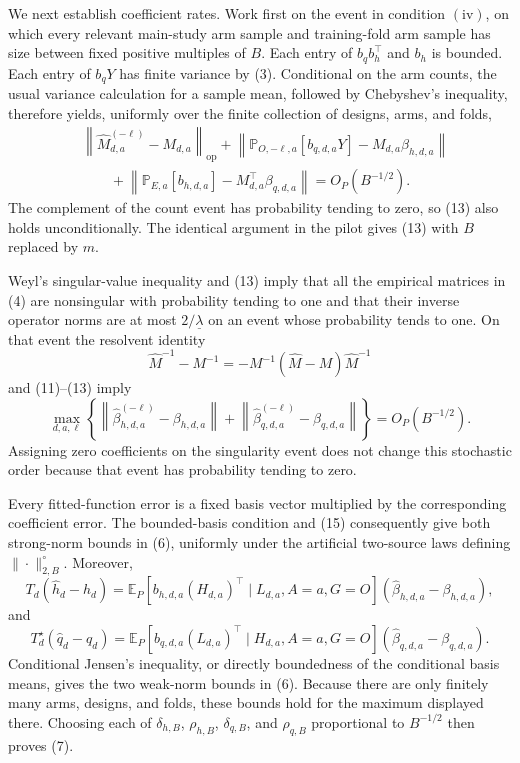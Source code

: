 We next establish coefficient rates.  Work first on the event in condition \(\mathrm{(iv)}\), on which every relevant main-study arm sample and training-fold arm sample has size between fixed positive multiples of \(B\).  Each entry of \(b_qb_h^\top\) and \(b_h\) is bounded.  Each entry of \(b_qY\) has finite variance by (3).  Conditional on the arm counts, the usual variance calculation for a sample mean, followed by Chebyshev's inequality, therefore yields, uniformly over the finite collection of designs, arms, and folds,
\[
\begin{aligned}
 &\left\|\widehat M_{d,a}^{(-\ell)}-M_{d,a}\right\|_{\mathrm{op}}
 +\left\|\mathbb P_{O,-\ell,a}[b_{q,d,a}Y]
             -M_{d,a}\beta_{h,d,a}\right\|\\
 &\qquad
 +\left\|\mathbb P_{E,a}[b_{h,d,a}]
             -M_{d,a}^\top\beta_{q,d,a}\right\|
 =O_P(B^{-1/2}).                                         \tag{13}
\end{aligned}
\]
The complement of the count event has probability tending to zero, so (13) also holds unconditionally.  The identical argument in the pilot gives (13) with \(B\) replaced by \(m\).

Weyl's singular-value inequality and (13) imply that all the empirical matrices in (4) are nonsingular with probability tending to one and that their inverse operator norms are at most \(2/\underline\lambda\) on an event whose probability tends to one.  On that event the resolvent identity
\[
 \widehat M^{-1}-M^{-1}
 =-M^{-1}(\widehat M-M)\widehat M^{-1}                   \tag{14}
\]
and (11)--(13) imply
\[
 \max_{d,a,\ell}\left\{
 \left\|\widehat\beta_{h,d,a}^{(-\ell)}-\beta_{h,d,a}\right\|
 +\left\|\widehat\beta_{q,d,a}^{(-\ell)}-\beta_{q,d,a}\right\|
 \right\}=O_P(B^{-1/2}).                                \tag{15}
\]
Assigning zero coefficients on the singularity event does not change this stochastic order because that event has probability tending to zero.

Every fitted-function error is a fixed basis vector multiplied by the corresponding coefficient error.  The bounded-basis condition and (15) consequently give both strong-norm bounds in (6), uniformly under the artificial two-source laws defining \(\|\cdot\|_{2,B}^{\circ}\).  Moreover,
\[
 T_d(\widehat h_d-h_d)
 =\mathbb E_P\!\left[b_{h,d,a}(H_{d,a})^\top
 \mid L_{d,a},A=a,G=O\right]
 (\widehat\beta_{h,d,a}-\beta_{h,d,a}),                  \tag{16}
\]
and
\[
 T_d^\star(\widehat q_d-q_d)
 =\mathbb E_P\!\left[b_{q,d,a}(L_{d,a})^\top
 \mid H_{d,a},A=a,G=O\right]
 (\widehat\beta_{q,d,a}-\beta_{q,d,a}).                 \tag{17}
\]
Conditional Jensen's inequality, or directly boundedness of the conditional basis means, gives the two weak-norm bounds in (6).  Because there are only finitely many arms, designs, and folds, these bounds hold for the maximum displayed there.  Choosing each of \(\delta_{h,B}\), \(\rho_{h,B}\), \(\delta_{q,B}\), and \(\rho_{q,B}\) proportional to \(B^{-1/2}\) then proves (7).

